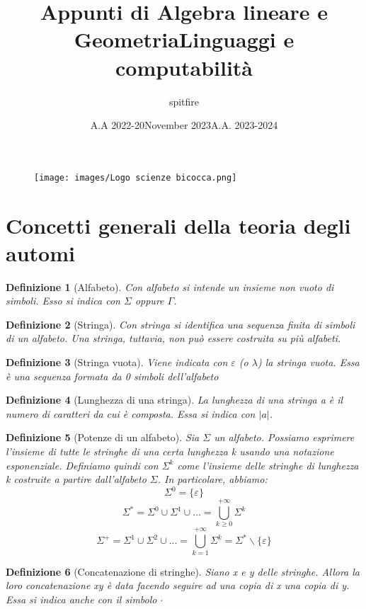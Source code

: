 \documentclass[12pt]{article}
\title{Appunti di Algebra lineare e Geometria}
\date{A.A 2022-20}
\title{Linguaggi e computabilità}
\author{spitfire}
\date{November 2023}
\newtheorem{Definizione}{Definizione}[subsection]
\begin{document}
\begin{figure}
\centering
\texttt{[image: images/Logo scienze bicocca.png]}
\end{figure}

\vspace{10cm}
\date{A.A. 2023-2024}
\maketitle

\newpage

\tableofcontents
\newpage
\section{Concetti generali della teoria degli automi}
\begin{Definizione}[Alfabeto]
    Con alfabeto si intende un insieme non vuoto di simboli. Esso si indica con $\Sigma$ oppure $\Gamma$.
\end{Definizione}
\begin{Definizione}[Stringa]
    Con stringa si identifica una sequenza finita di simboli di un alfabeto. Una stringa, tuttavia, non può essere costruita su più alfabeti.
\end{Definizione}
\begin{Definizione}[Stringa vuota]
    Viene indicata con $\varepsilon$ (o $\lambda$) la stringa vuota. Essa è una sequenza formata da 0 simboli dell'alfabeto
\end{Definizione}
\begin{Definizione}[Lunghezza di una stringa]
    La lunghezza di una stringa a è il numero di caratteri da cui è composta. Essa si indica con $|a|$.
\end{Definizione}
\begin{Definizione}[Potenze di un alfabeto]
    Sia $\Sigma$ un alfabeto. Possiamo esprimere l'insieme di tutte le stringhe di una certa lunghezza k usando una notazione esponenziale. Definiamo quindi con $\Sigma^k$ come l'insieme delle stringhe di lunghezza k costruite a partire dall'alfabeto $\Sigma$. In particolare, abbiamo:
    $$\Sigma^0 = \{\varepsilon\}$$
    $$\Sigma^* = \Sigma^0 \cup \Sigma^1 \cup ... = \bigcup_{k \geq 0}^{+\infty} \Sigma^k$$
    $$\Sigma^+ = \Sigma^1 \cup \Sigma^2 \cup ... = \bigcup_{k = 1}^{+\infty} \Sigma^k = \Sigma^* \backslash \{\varepsilon\}$$
\end{Definizione}
\begin{Definizione}[Concatenazione di stringhe]
    Siano x e y delle stringhe. Allora la loro concatenazione xy è data facendo seguire ad una copia di x una copia di y. Essa si indica anche con il simbolo $\cdot$
\end{Definizione}
\end{document}
